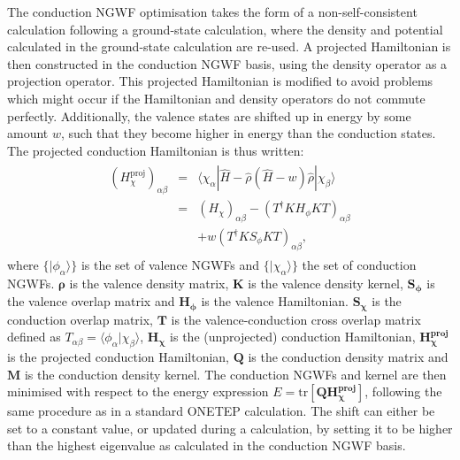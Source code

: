 \documentclass[letterpaper,10pt,english]{sphinxmanual}
\begin{document}
The conduction NGWF optimisation takes the form of a non-self-consistent
calculation following a ground-state calculation, where the density and
potential calculated in the ground-state calculation are re-used. A
projected Hamiltonian is then constructed in the conduction NGWF basis,
using the density operator as a projection operator. This projected
Hamiltonian is modified to avoid problems which might occur if the
Hamiltonian and density operators do not commute perfectly.
Additionally, the valence states are shifted up in energy by some amount
\(w\), such that they become higher in energy than the conduction
states. The projected conduction Hamiltonian is thus written:
\begin{equation*}
\begin{split}\begin{aligned}
\left(H_\chi^{\textrm{proj}}\right)_{\alpha\beta}&=&\langle \chi_\alpha|\hat{H}-\hat{\rho}\left(\hat{H}-w\right)\hat{\rho}|\chi_\beta\rangle\\ \nonumber
&=&\left(H_\chi\right)_{\alpha\beta} -\left(T^\dag K H_\phi KT\right)_{\alpha\beta}\\ \nonumber
&&+w\left(T^\dag K S_\phi KT\right)_{\alpha\beta}, \end{aligned}\end{split}
\end{equation*}
where \(\{|\phi_{\alpha}\rangle\}\) is the set of valence NGWFs and
\(\{|\chi_{\alpha}\rangle\}\) the set of conduction NGWFs.
\({\bm{\rho}}\) is the valence density matrix, \(\mathbf{K}\) is
the valence density kernel, \(\mathbf{S_{\phi}}\) is the valence
overlap matrix and \(\mathbf{H_{\phi}}\) is the valence Hamiltonian.
\(\mathbf{S_{\chi}}\) is the conduction overlap matrix,
\(\mathbf{T}\) is the valence-conduction cross overlap matrix
defined as
\(T_{\alpha\beta}=\langle \phi_{\alpha} | \chi_{\beta} \rangle\),
\(\mathbf{H_{\chi}}\) is the (unprojected) conduction Hamiltonian,
\(\mathbf{H_\chi^{\textrm{proj}}}\) is the projected conduction
Hamiltonian, \(\mathbf{Q}\) is the conduction density matrix and
\(\mathbf{M}\) is the conduction density kernel. The conduction
NGWFs and kernel are then minimised with respect to the energy
expression
\(E=\text{tr}\left[\mathbf{Q}\mathbf{H_\chi^{\textrm{proj}}}\right]\),
following the same procedure as in a standard ONETEP calculation. The
shift can either be set to a constant value, or updated during a
calculation, by setting it to be higher than the highest eigenvalue as
calculated in the conduction NGWF basis.
\end{document}
